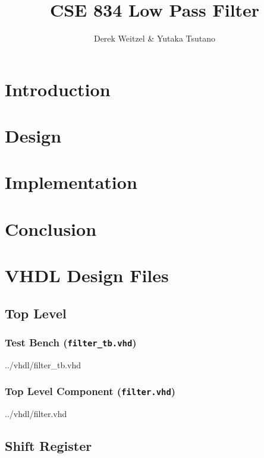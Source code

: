 \documentclass[12pt]{article}
\title{CSE 834 Low Pass Filter}
\author{Derek Weitzel \& Yutaka Tsutano}
\newcommand{\VhdlListing}{}
\begin{document}
\maketitle

\section{Introduction} \label{sec:introduction}


\section{Design}
\label{sec:design}




\section{Implementation} \label{sec:implementation}


\section{Conclusion} \label{sec:conclusion}


\newpage
\appendix

\section{VHDL Design Files}

\subsection{Top Level}

\subsubsection{Test Bench (\texttt{filter\_tb.vhd})}
\VhdlListing{../vhdl/filter_tb.vhd}
\label{lst:filter_tb.vhd}

\subsubsection{Top Level Component (\texttt{filter.vhd})}
\VhdlListing{../vhdl/filter.vhd}
\label{lst:filter.vhd}

\subsection{Shift Register}
\end{document}
